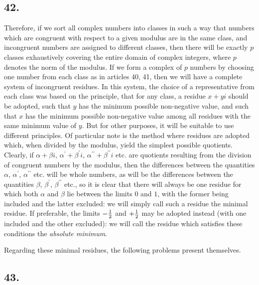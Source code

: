 \documentclass[twoside,12pt]{memoir}
\let\oldfrac\frac
\def\frac#1#2{\mathchoice{\tfrac{#1}{#2}}{\oldfrac{#1}{#2}}{\genfrac{}{}{}{2}{#1}{#2\mathstrut}}{\genfrac{}{}{}{3}{#1}{#2\mathstrut}}}
\begin{document}
\subsection*{42.}

Therefore, if we sort all complex numbers into classes in such a way that numbers which are congruent with respect to a given modulus are in the same class, and incongruent numbers are assigned to different classes, then there will be exactly \(p\) classes exhaustively covering the entire domain of complex integers, where \(p\) denotes the norm of the modulus. If we form a complex of \(p\) numbers by choosing one number from each class as in articles 40, 41, then we will have a complete system of incongruent residues. In this system, the choice of a representative from each class was based on the principle, that for any class, a residue \(x+yi\) should be adopted, such that \(y\) has the minimum possible non-negative value, and such that \(x\) has the minimum possible non-negative value among all residues with the same minimum value of \(y\). But for other purposes, it will be suitable to use different principles. Of particular note is the method where residues are adopted which, when divided by the modulus, yield the simplest possible quotients. Clearly, if \(\alpha+\beta i\), \(\alpha^{\prime}+\beta^{\prime} i\), \(\alpha^{\prime \prime}+\beta^{\prime \prime} i\) etc{.} are quotients resulting from the division of congruent numbers by the modulus, then the differences between the quantities \(\alpha\), \(\alpha^{\prime}\), \(\alpha^{\prime \prime}\) etc{.} will be whole numbers, as will be the differences between the quantities \(\beta\), \(\beta^{\prime}\), \(\beta^{\prime \prime}\) etc{.}, so it is clear that there will always be one residue for which both \(\alpha\) and \(\beta\) lie between the limits \(0\) and \(1\), with the former being included and the latter excluded: we will simply call such a residue the minimal residue. If preferable, the limits \(-\frac{1}{2} \) and \(+\frac{1}{2} \) may be adopted instead (with one included and the other excluded): we will call the residue which satisfies these conditions the \textit{absolute minimum}.

Regarding these minimal residues, the following problems present themselves.
%

\subsection*{43.}
\end{document}
